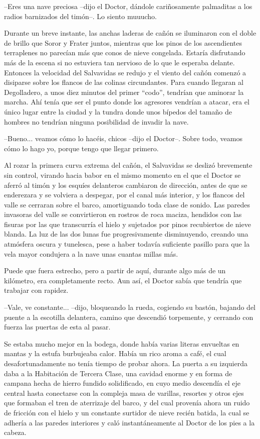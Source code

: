 --Eres una nave preciosa --dijo el Doctor, dándole cariñosamente palmaditas a los radios barnizados del timón--. Lo siento muuucho.
 
Durante un breve instante, las anchas laderas de cañón se iluminaron con el doble de brillo que Soror y Frater juntos, mientras que los pinos de los ascendientes terraplenes no parecían más que conos de nieve congelada. Estaría disfrutando más de la escena si no estuviera tan nervioso de lo que le esperaba delante. Entonces la velocidad del Salvavidas se redujo y el viento del cañón comenzó a disiparse sobre los flancos de las colinas circundantes. Para cuando llegaran al Degolladero, a unos diez minutos del primer ``codo'', tendrían que aminorar la marcha. Ahí tenía que ser el punto donde los agresores vendrían a atacar, era el único lugar entre la ciudad y la tundra donde unos bípedos del tamaño de hombres no tendrían ninguna posibilidad de invadir la nave.
 
--Bueno... veamos cómo lo hacéis, chicos --dijo el Doctor--. Sobre todo, veamos cómo lo hago yo, porque tengo que llegar primero.
 
Al rozar la primera curva extrema del cañón, el Salvavidas se deslizó brevemente sin control, virando hacia babor en el mismo momento en el que el Doctor se aferró al timón y los esquíes delanteros cambiaron de dirección, antes de que se enderezara y se volviera a despegar, por el canal más interior, y los flancos del valle se cerraran sobre el barco, amortiguando toda clase de sonido. Las paredes invasoras del valle se convirtieron en rostros de roca maciza, hendidos con las fisuras por las que transcurría el hielo y sujetados por pinos recubiertos de nieve blanda. La luz de las dos lunas fue progresivamente disminuyendo, creando una atmósfera oscura y tunelesca, pese a haber todavía suficiente pasillo para que la vela mayor condujera a la nave unas cuantas millas más.
 
Puede que fuera estrecho, pero a partir de aquí, durante algo más de un kilómetro, era completamente recto. Aun así, el Doctor sabía que tendría que trabajar con rapidez.
 
--Vale, ve constante... --dijo, bloqueando la rueda, cogiendo su bastón, bajando del puente a la escotilla delantera, camino que descendió torpemente, y cerrando con fuerza las puertas de esta al pasar.
 
Se estaba mucho mejor en la bodega, donde había varias literas envueltas en mantas y la estufa burbujeaba calor. Había un rico aroma a café, el cual desafortunadamente no tenía tiempo de probar ahora. La puerta a su izquierda daba a la Habitación de Tercera Clase, una cavidad enorme y en forma de campana hecha de hierro fundido solidificado, en cuyo medio descendía el eje central hasta conectarse con la compleja masa de varillas, resortes y otros ejes que formaban el tren de aterrizaje del barco, y del cual provenía ahora un ruido de fricción con el hielo y un constante surtidor de nieve recién batida, la cual se adhería a las paredes interiores y caló instantáneamente al Doctor de los pies a la cabeza.
 
